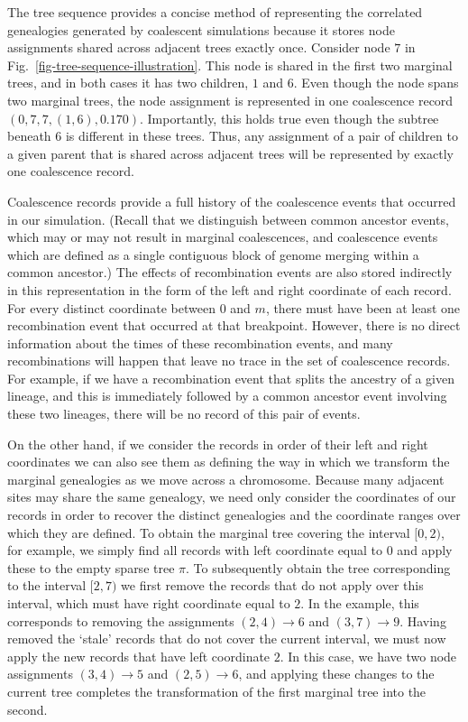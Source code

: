 \documentclass[10pt,letterpaper]{article}
\begin{document}
The tree sequence provides a concise method of representing the correlated
genealogies generated by coalescent simulations because it stores node
assignments shared across adjacent trees exactly once. Consider node $7$ in
Fig.~\ref{fig-tree-sequence-illustration}. This node is shared in the first
two marginal trees, and in both cases it has two children, $1$ and $6$. Even though
the node spans two marginal trees, the node assignment is represented in one
coalescence record $(0, 7, 7, (1, 6), 0.170)$.  Importantly, this holds true
even though the subtree beneath $6$ is different in these trees. Thus, any
assignment of a pair of children to a given parent that is shared across
adjacent trees will be represented by exactly one coalescence record.

Coalescence records provide a full history of the coalescence events
that occurred in our simulation.
 (Recall that we distinguish between common ancestor events, which
may or may not result in marginal coalescences, and coalescence events which
are defined as a single contiguous block of genome merging within a common
ancestor.) The effects of recombination events are also stored indirectly in
this representation in the form of the left and right coordinate of each
record. For every distinct coordinate between $0$ and $m$, there must have been
at least one recombination event that occurred at that breakpoint. However,
there is no direct information about the times of these recombination events,
and many recombinations will happen that leave no trace in the set of
coalescence records. For example, if we have a recombination event that splits
the ancestry of a given lineage, and this is immediately followed by a common
ancestor event involving these two lineages, there will be no record of this
pair of events.

On the other hand, if we consider the records in order of their left and right coordinates
we can also see them as defining the way in which we transform the
marginal genealogies as we move across a chromosome.  Because many
adjacent sites may share the same genealogy, we need only consider the
coordinates of our records in order to recover the distinct genealogies and
the coordinate ranges over which they are defined. To obtain the marginal
tree covering the interval $[0, 2)$, for example, we simply find all records
with left coordinate equal to $0$ and apply these to the empty sparse tree
$\pi$. To subsequently obtain the tree corresponding to the interval $[2, 7)$
we first remove the records that do not apply over this interval, which must
have right coordinate equal to $2$. In the example, this corresponds to
removing the assignments $(2,4) \rightarrow 6$ and $(3, 7) \rightarrow 9$.
Having removed the `stale' records that do not cover the current interval, we
must now apply the new records that have left coordinate $2$. In this case, we
have two node assignments $(3,4) \rightarrow 5$ and $(2, 5) \rightarrow 6$, and
applying these changes to the current tree completes the transformation of the
first marginal tree into the second.
\end{document}
